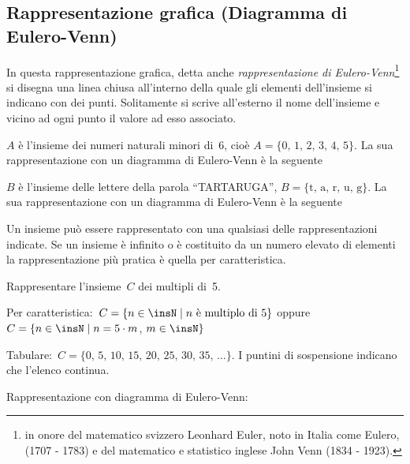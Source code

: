 \subsection{Rappresentazione grafica (Diagramma di Eulero-Venn)}

In questa rappresentazione grafica, detta anche \textit{rappresentazione
di Eulero-Venn}\footnote{in onore del matematico svizzero Leonhard Euler, noto in Italia come Eulero, (1707 - 1783) e del matematico e statistico inglese John Venn (1834 - 1923).} si disegna una linea chiusa all'interno della quale gli elementi
dell'insieme si indicano con dei punti. Solitamente si scrive all'esterno il nome dell'insieme
e vicino ad ogni punto il valore ad esso associato.

\begin{exrig}
 \begin{esempio}
 $A$ è l'insieme dei numeri naturali minori di~6, cioè $A=\{\text{0, 1, 2, 3, 4, 5}\}$.
 La sua rappresentazione con un diagramma di Eulero-Venn è la seguente
 \begin{center}
  
 \end{center}

 \end{esempio}

 \begin{esempio}
 $B$ è l'insieme delle lettere della parola ``TARTARUGA'', $B=\{\text{t, a, r, u, g}\}$.
 La sua rappresentazione con un diagramma di Eulero-Venn è la seguente
 \begin{center}
  
 \end{center}

 \end{esempio}

\end{exrig}

Un insieme può essere rappresentato con una qualsiasi delle
rappresentazioni indicate. Se un insieme è infinito o è costituito
da un numero elevato di elementi la rappresentazione più pratica è
quella per caratteristica.

\begin{exrig}
 \begin{esempio}
 Rappresentare l'insieme~$C$ dei multipli di~5.

 Per caratteristica:~$C=\{n\in\insN\mid n\text{ è multiplo di }5\}$ oppure
$C=\{n\in\insN\mid n=5\cdot m$, $m\in\insN\}$

Tabulare:~$C=\{\text{0, 5, 10, 15, 20, 25, 30, 35, }\dots\}$. I puntini di sospensione indicano che l'elenco continua.

Rappresentazione con diagramma di Eulero-Venn:
\begin{center}
 
\end{center}
 \end{esempio}
\end{exrig}

